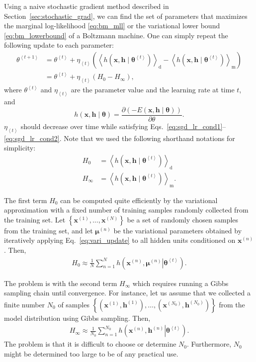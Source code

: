 \documentclass[dissertation,nocontribution]{aaltoseries}
\newcommand{\qt}[1]{\left<#1\right>}
\newcommand{\vect}[1]{\mathbf{#1}}
\newcommand{\vects}[1]{\boldsymbol{#1}}
\newcommand{\vh}[0]{\vect{h}}
\newcommand{\vx}[0]{\vect{x}}
\newcommand{\td}[0]{\text{d}}
\newcommand{\vmu}[0]{\vects{\mu}}
\newcommand{\tf}[0]{\text{m}}
\newcommand{\TT}[0]{{\vects{\theta}}}
\begin{document}
Using a naive stochastic gradient method described in
Section~\ref{sec:stochastic_grad}, we can find the set of
parameters that maximizes the marginal log-likelihood
\eqref{eq:bm_mll} or the variational lower bound
\eqref{eq:bm_lowerbound} of a Boltzmann machine. One can
simply repeat the following update to each parameter:
\begin{align}
    \theta^{\qt{t+1}} &= \theta^{\qt{t}} + \eta_{\qt{t}} \left( 
    \left< h(\vx, \vh\mid \TT^{\qt{t}})
    \right>_\td 
    -
    \left< h(\vx, \vh\mid \TT^{\qt{t}})
    \right>_\tf \right) 
    \nonumber
    \\
    \label{eq:sap_grad}
    &= \theta^{\qt{t}} + \eta_{\qt{t}} \left( H_0 - H_\infty \right),
\end{align}
where $\theta^{\qt{t}}$ and $\eta_{\qt{t}}$ are the parameter value and
the learning rate at time $t$, and
\[
h(\vx, \vh \mid \TT) = \frac{\partial
    \left(-E(\vx, \vh\mid\TT)\right)}{\partial \theta}.
\]
$\eta_{\qt{t}}$ should decrease over time while satisfying
Eqs.~\eqref{eq:sgd_lr_cond1}--\eqref{eq:sgd_lr_cond2}. Note
that we used the following shorthand notations for
simplicity:
\begin{align*}
    H_0 &= \left< h(\vx, \vh\mid \TT^{\qt{t}})
    \right>_\td \\
    H_\infty &= \left< h(\vx, \vh\mid \TT^{\qt{t}})
    \right>_\tf.
\end{align*}

The first term $H_0$ can be computed quite efficiently by
the variational approximation with a fixed number of
training samples randomly collected from the training set.
Let $\left\{ \vx^{(1)}, \dots, \vx^{(N)} \right\}$ be a
set  of randomly chosen samples from the training set, and
let $\vmu^{(n)}$ be the variational parameters obtained by
iteratively applying Eq.~\eqref{eq:vari_update} to all
hidden units conditioned on $\vx^{(n)}$. Then, 
\begin{align*}
    H_0 \approx \frac{1}{N}\sum_{n=1}^{N} h\left(\left.\vx^{(n)}, \vmu^{(n)}
    \right| \TT^{\qt{t}}\right).
\end{align*}

The problem is with the second term $H_\infty$ which requires
running a Gibbs sampling chain until convergence. For instance,
let us assume that we collected a finite number $N_0$ of
samples $\left\{ (\vx^{(1)}, \vh^{(1)}), \dots,
(\vx^{(N_0)}, \vh^{(N_0)}) \right\}$ from the model
distribution using Gibbs sampling. Then, 
\begin{align*}
    H_\infty \approx \frac{1}{N_0} \sum_{n=1}^{N_0}
    h\left(\left.\vx^{(n)}, \vh^{(n)} \right| \TT^{\qt{t}}\right).
\end{align*}
The 
problem is that it is difficult to choose or determine $N_0$.
Furthermore, $N_0$ might be determined too large to be of any
practical use.
\end{document}
